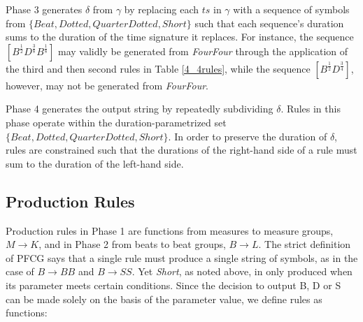 \documentclass{article}
\begin{document}
Phase 3 generates $\delta$ from $\gamma$ by replacing each $ts$ in $\gamma$ with a sequence of symbols from $\{Beat,\allowbreak Dotted,\allowbreak QuarterDotted,\allowbreak Short \}$ such that each sequence's duration sums to the duration of the time signature it replaces. For instance, the sequence
$[B^\frac{1}{2} D^\frac{3}{8} B^\frac{1}{8}]$ may validly be generated from \emph{FourFour} through the application of the third and then second rules in Table \ref{4_4rules}, 
while the sequence $[B^\frac{1}{2} D^\frac{3}{4}]$, however, may not be generated from \emph{FourFour}.

Phase 4 generates the output string by repeatedly subdividing $\delta$. Rules in this phase operate within the duration-parametrized set $\{Beat,\allowbreak Dotted,\allowbreak QuarterDotted,\allowbreak Short\}$. In order to preserve the duration of $\delta$, rules are constrained such that the durations of the right-hand side of a rule must sum to the duration of the left-hand side.









\subsection{Production Rules}

Production rules in Phase 1 are functions from measures to measure groups, $M \rightarrow K$, and in Phase 2 from beats to beat groups, $B \rightarrow L$. The strict definition of PFCG says that a single rule must produce a single string of symbols, as in the case of $B \rightarrow BB$ and $B \rightarrow SS$.  Yet \emph{Short}, as noted above, in only produced when its parameter meets certain conditions. Since the decision to output B, D or S can be made solely on the basis of the parameter value, we define rules as functions:
\end{document}
